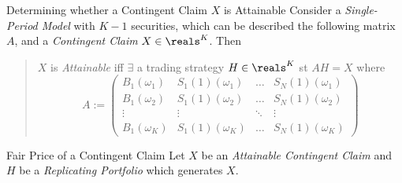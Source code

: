 \documentclass[11pt,a4paper]{article}
\begin{document}
  \begin{remark}{Determining whether a Contingent Claim $X$ is Attainable}
    Consider a \textit{Single-Period Model} with $K-1$ securities, which can be described the following matrix $A$, and a \textit{Contingent Claim} $X\in\reals^K$. Then
    \begin{quote}
      $X$ is \textit{Attainable} iff $\exists$ a trading strategy $H\in\reals^K$ st $AH=X$ where
      \[ A:=\begin{pmatrix}
          B_1(\omega_1)&S_1(1)(\omega_1)&\dots&S_N(1)(\omega_1)\\
          B_1(\omega_2)&S_1(1)(\omega_2)&\dots&S_N(1)(\omega_2)\\
          \vdots&\vdots&\ddots&\vdots\\
          B_1(\omega_K)&S_1(1)(\omega_K)&\dots&S_N(1)(\omega_K)
      \end{pmatrix} \]
    \end{quote}
  \end{remark}

  \begin{theorem}{Fair Price of a Contingent Claim}\label{the_fair_price_of_a_contingent_claim}
    Let $X$ be an \textit{Attainable Contingent Claim} and $H$ be a \textit{Replicating Portfolio} which generates $X$.
    \begin{quote}
    \end{quote}
  \end{theorem}
\end{document}
